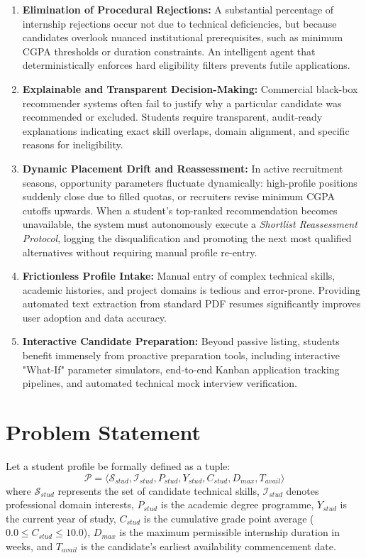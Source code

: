 \begin{enumerate}[label=\textbf{\arabic*.}]
	\item \textbf{Elimination of Procedural Rejections:} A substantial percentage of internship rejections occur not due to technical deficiencies, but because candidates overlook nuanced institutional prerequisites, such as minimum CGPA thresholds or duration constraints. An intelligent agent that deterministically enforces hard eligibility filters prevents futile applications.
	\item \textbf{Explainable and Transparent Decision-Making:} Commercial black-box recommender systems often fail to justify why a particular candidate was recommended or excluded. Students require transparent, audit-ready explanations indicating exact skill overlaps, domain alignment, and specific reasons for ineligibility.
	\item \textbf{Dynamic Placement Drift and Reassessment:} In active recruitment seasons, opportunity parameters fluctuate dynamically: high-profile positions suddenly close due to filled quotas, or recruiters revise minimum CGPA cutoffs upwards. When a student's top-ranked recommendation becomes unavailable, the system must autonomously execute a \textit{Shortlist Reassessment Protocol}, logging the disqualification and promoting the next most qualified alternatives without requiring manual profile re-entry.
	\item \textbf{Frictionless Profile Intake:} Manual entry of complex technical skills, academic histories, and project domains is tedious and error-prone. Providing automated text extraction from standard PDF resumes significantly improves user adoption and data accuracy.
	\item \textbf{Interactive Candidate Preparation:} Beyond passive listing, students benefit immensely from proactive preparation tools, including interactive "What-If" parameter simulators, end-to-end Kanban application tracking pipelines, and automated technical mock interview verification.
\end{enumerate}

\section{Problem Statement} \label{S1.3}
Let a student profile be formally defined as a tuple:
\begin{equation}
	\mathcal{P} = \langle \mathcal{S}_{stud}, \mathcal{I}_{stud}, P_{stud}, Y_{stud}, C_{stud}, D_{max}, T_{avail} \rangle \label{e1.1}
\end{equation}
where $\mathcal{S}_{stud}$ represents the set of candidate technical skills, $\mathcal{I}_{stud}$ denotes professional domain interests, $P_{stud}$ is the academic degree programme, $Y_{stud}$ is the current year of study, $C_{stud}$ is the cumulative grade point average ($0.0 \le C_{stud} \le 10.0$), $D_{max}$ is the maximum permissible internship duration in weeks, and $T_{avail}$ is the candidate's earliest availability commencement date.

